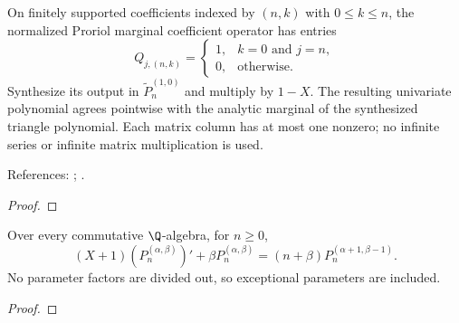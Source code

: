 
\begin{supporting}
\begin{theorem}
\label{thm:proriol-marginal-coefficients}
\leanok
On finitely supported coefficients indexed by $(n,k)$ with $0\le k\le n$, the
normalized Proriol marginal coefficient operator has entries
\[
 Q_{j,(n,k)}=\begin{cases}1,&k=0\text{ and }j=n,\\0,&\text{otherwise}.\end{cases}
\]
Synthesize its output in $\widetilde P_n^{(1,0)}$ and multiply by $1-X$.
The resulting univariate polynomial agrees pointwise with the analytic marginal
of the synthesized triangle polynomial. Each matrix column has at most one
nonzero; no infinite series or infinite matrix multiplication is used.

References: \cite[Section 3.1]{gutleb-olver}; \cite[equation (2.7)]{gutleb-thesis}.
\end{theorem}
\begin{proof}
\leanok
\end{proof}

\begin{theorem}
\label{thm:jacobi-beta-lowering}
\leanok
Over every commutative $\Q$-algebra, for $n\ge0$,
\[
 (X+1)(P_n^{(\alpha,\beta)})'+\beta P_n^{(\alpha,\beta)}
 =(n+\beta)P_n^{(\alpha+1,\beta-1)}.
\]
No parameter factors are divided out, so exceptional parameters are included.

\end{theorem}
\begin{proof}
\leanok
\end{proof}



\end{supporting}
